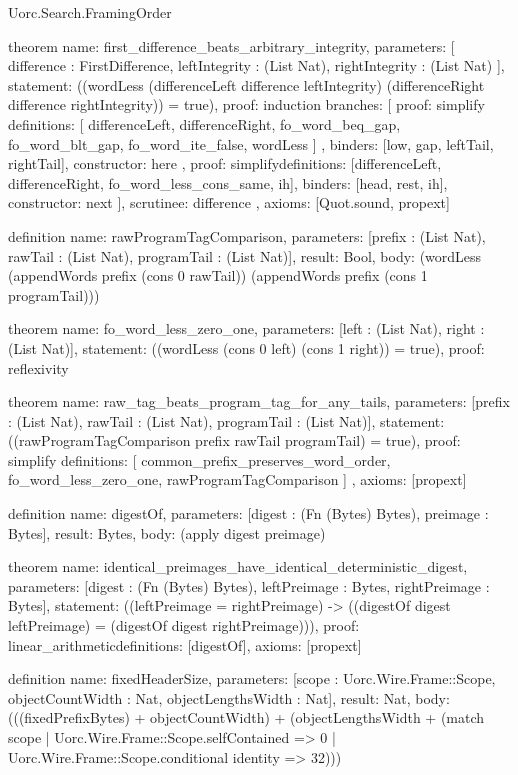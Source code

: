 \begin{lexlean}{Uorc.Search.FramingOrder}
\begin{semanticmodule}
theorem{
  name: first_difference_beats_arbitrary_integrity,
  parameters: [
    difference : FirstDifference,
    leftIntegrity : (List Nat),
    rightIntegrity : (List Nat)
  ],
  statement: ((wordLess (differenceLeft difference leftIntegrity) (differenceRight difference rightIntegrity)) = true),
  proof: induction{
    branches: [
      {
        proof: simplify{
          definitions: [
            differenceLeft,
            differenceRight,
            fo_word_beq_gap,
            fo_word_blt_gap,
            fo_word_ite_false,
            wordLess
          ]
        },
        binders: [low, gap, leftTail, rightTail],
        constructor: here
      },
      {
        proof: simplify{definitions: [differenceLeft, differenceRight, fo_word_less_cons_same, ih]},
        binders: [head, rest, ih],
        constructor: next
      }
    ],
    scrutinee: difference
  },
  axioms: [Quot.sound, propext]
}

definition{
  name: rawProgramTagComparison,
  parameters: [prefix : (List Nat), rawTail : (List Nat), programTail : (List Nat)],
  result: Bool,
  body: (wordLess (appendWords prefix (cons 0 rawTail)) (appendWords prefix (cons 1 programTail)))
}

theorem{
  name: fo_word_less_zero_one,
  parameters: [left : (List Nat), right : (List Nat)],
  statement: ((wordLess (cons 0 left) (cons 1 right)) = true),
  proof: reflexivity{}
}

theorem{
  name: raw_tag_beats_program_tag_for_any_tails,
  parameters: [prefix : (List Nat), rawTail : (List Nat), programTail : (List Nat)],
  statement: ((rawProgramTagComparison prefix rawTail programTail) = true),
  proof: simplify{
    definitions: [
      common_prefix_preserves_word_order,
      fo_word_less_zero_one,
      rawProgramTagComparison
    ]
  },
  axioms: [propext]
}

definition{
  name: digestOf,
  parameters: [digest : (Fn (Bytes) Bytes), preimage : Bytes],
  result: Bytes,
  body: (apply digest preimage)
}

theorem{
  name: identical_preimages_have_identical_deterministic_digest,
  parameters: [digest : (Fn (Bytes) Bytes), leftPreimage : Bytes, rightPreimage : Bytes],
  statement: ((leftPreimage = rightPreimage) -> ((digestOf digest leftPreimage) = (digestOf digest rightPreimage))),
  proof: linear_arithmetic{definitions: [digestOf]},
  axioms: [propext]
}

definition{
  name: fixedHeaderSize,
  parameters: [scope : Uorc.Wire.Frame::Scope, objectCountWidth : Nat, objectLengthsWidth : Nat],
  result: Nat,
  body: (((fixedPrefixBytes) + objectCountWidth) + (objectLengthsWidth + (match scope
    | Uorc.Wire.Frame::Scope.selfContained => 0
    | Uorc.Wire.Frame::Scope.conditional identity => 32)))
}


\end{semanticmodule}
\end{lexlean}
